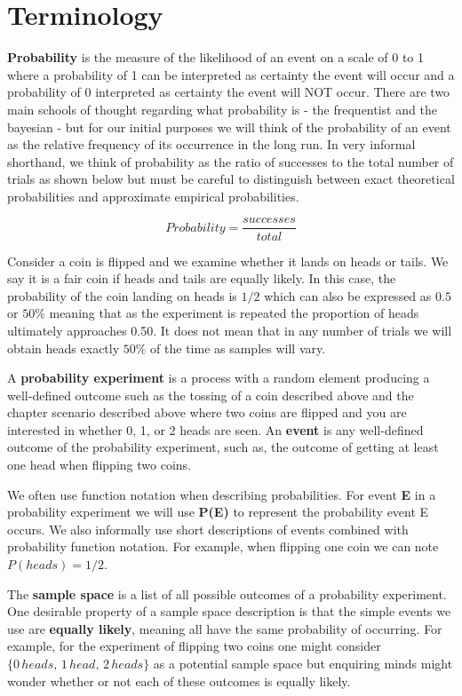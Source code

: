 \documentclass[]{book}
\theoremstyle{definition}
\theoremstyle{definition}
\theoremstyle{definition}
\theoremstyle{remark}
\begin{document}
\section{Terminology}\label{terminology}

\textbf{Probability} is the measure of the likelihood of an event on a
scale of 0 to 1 where a probability of 1 can be interpreted as certainty
the event will occur and a probability of 0 interpreted as certainty the
event will NOT occur. There are two main schools of thought regarding
what probability is - the frequentist and the bayesian - but for our
initial purposes we will think of the probability of an event as the
relative frequency of its occurrence in the long run. In very informal
shorthand, we think of probability as the ratio of successes to the
total number of trials as shown below but must be careful to distinguish
between exact theoretical probabilities and approximate empirical
probabilities.

\[Probability = \frac{successes}{total}\]

Consider a coin is flipped and we examine whether it lands on heads or
tails. We say it is a fair coin if heads and tails are equally likely.
In this case, the probability of the coin landing on heads is \(1/2\)
which can also be expressed as \(0.5\) or \(50\%\) meaning that as the
experiment is repeated the proportion of heads ultimately approaches
0.50. It does not mean that in any number of trials we will obtain heads
exactly \(50\%\) of the time as samples will vary.

A \textbf{probability experiment} is a process with a random element
producing a well-defined outcome such as the tossing of a coin described
above and the chapter scenario described above where two coins are
flipped and you are interested in whether 0, 1, or 2 heads are seen. An
\textbf{event} is any well-defined outcome of the probability
experiment, such as, the outcome of getting at least one head when
flipping two coins.

We often use function notation when describing probabilities. For event
\textbf{E} in a probability experiment we will use \textbf{P(E)} to
represent the probability event E occurs. We also informally use short
descriptions of events combined with probability function notation. For
example, when flipping one coin we can note \(P(heads)=1/2\).

The \textbf{sample space} is a list of all possible outcomes of a
probability experiment. One desirable property of a sample space
description is that the simple events we use are \textbf{equally
likely}, meaning all have the same probability of occurring. For
example, for the experiment of flipping two coins one might consider
\(\{0\,heads,\,1\, head,\,2\,heads\}\) as a potential sample space but
enquiring minds might wonder whether or not each of these outcomes is
equally likely.
\end{document}
